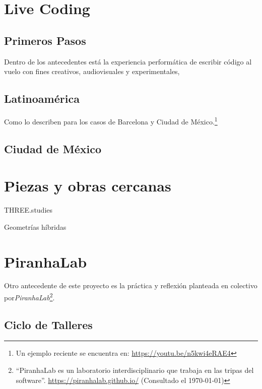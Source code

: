 \section{Live Coding}


\subsection{Primeros Pasos}

Dentro de los antecedentes está la experiencia performática de escribir código al vuelo con fines creativos, audiovisuales y experimentales,

\subsection{Latinoamérica}

Como lo describen \cite{villasenor} para los casos de Barcelona y Ciudad de México.\footnote{Un ejemplo reciente se encuentra en: \url{https://youtu.be/n5kwi4eRAE4}} 

\subsection{Ciudad de México}

\section{Piezas y obras cercanas} %

THREE.studies

Geometrías híbridas 

\section{PiranhaLab}

Otro antecedente de este proyecto es la práctica y reflexión planteada en colectivo por\textit{PiranhaLab}\footnote{``PiranhaLab es un laboratorio interdisciplinario que trabaja en las tripas del software''. \url{https://piranhalab.github.io/} (Consultado el \today)}.

\subsection{Ciclo de Talleres}


